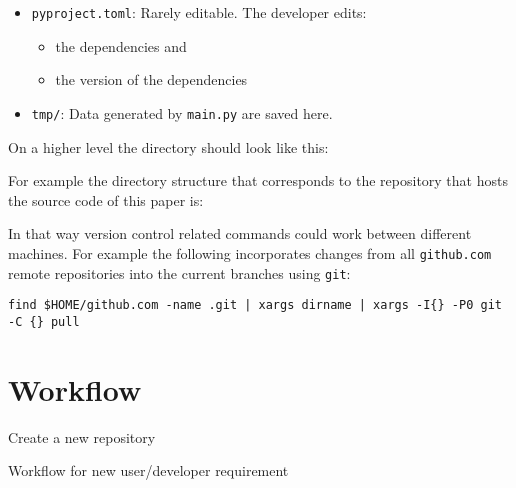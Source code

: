 \documentclass[journal]{IEEEtran}
\begin{document}
\begin{itemize}
	\item \texttt{pyproject.toml}: Rarely editable. The developer edits:
		\begin{itemize}
			\item the dependencies and
			\item the version of the dependencies
		\end{itemize}
	\item \texttt{tmp/}: Data generated by \texttt{main.py} are saved here.
\end{itemize}

On a higher level the directory should look like this:

For example the directory structure that corresponds to the repository that hosts the source code of this paper is:

In that way version control related commands could work between different machines. For example the following incorporates changes from all \texttt{github.com} remote repositories into the current branches using \texttt{git}:
\begin{verbatim}
find $HOME/github.com -name .git | xargs dirname | xargs -I{} -P0 git -C {} pull
\end{verbatim}

\section{Workflow}

\begin{algorithm}
	Create a new repository\;
	\Return{}
	\caption{Workflow for new user/developer requirement}
\end{algorithm}



\end{document}
